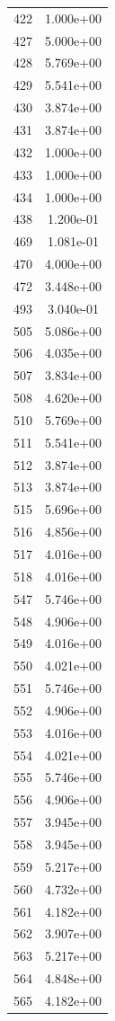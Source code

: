 \documentclass[12pt]{article}
\begin{document}
\begin{longtable}{@{}cc@{}}
422 & 1.000e+00 \\
427 & 5.000e+00 \\
428 & 5.769e+00 \\
429 & 5.541e+00 \\
430 & 3.874e+00 \\
431 & 3.874e+00 \\
432 & 1.000e+00 \\
433 & 1.000e+00 \\
434 & 1.000e+00 \\
438 & 1.200e-01 \\
469 & 1.081e-01 \\
470 & 4.000e+00 \\
472 & 3.448e+00 \\
493 & 3.040e-01 \\
505 & 5.086e+00 \\
506 & 4.035e+00 \\
507 & 3.834e+00 \\
508 & 4.620e+00 \\
510 & 5.769e+00 \\
511 & 5.541e+00 \\
512 & 3.874e+00 \\
513 & 3.874e+00 \\
515 & 5.696e+00 \\
516 & 4.856e+00 \\
517 & 4.016e+00 \\
518 & 4.016e+00 \\
547 & 5.746e+00 \\
548 & 4.906e+00 \\
549 & 4.016e+00 \\
550 & 4.021e+00 \\
551 & 5.746e+00 \\
552 & 4.906e+00 \\
553 & 4.016e+00 \\
554 & 4.021e+00 \\
555 & 5.746e+00 \\
556 & 4.906e+00 \\
557 & 3.945e+00 \\
558 & 3.945e+00 \\
559 & 5.217e+00 \\
560 & 4.732e+00 \\
561 & 4.182e+00 \\
562 & 3.907e+00 \\
563 & 5.217e+00 \\
564 & 4.848e+00 \\
565 & 4.182e+00 \\

\end{longtable}
\end{document}
